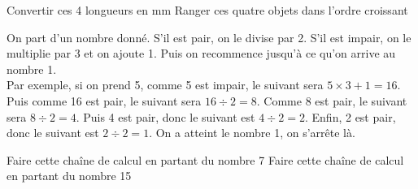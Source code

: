 \documentclass[../Cours.tex]{subfiles}
\begin{document}
\begin{questions}
    \question Convertir ces 4 longueurs en \unit{\milli\metre} 
    \question Ranger ces quatre objets dans l'ordre croissant 

    \clearpage

    On part d'un nombre donné. S'il est pair, on le divise par 2. S'il est impair, on le multiplie par 3 et on ajoute 1. Puis on recommence jusqu'à ce qu'on arrive au nombre 1.\\

    Par exemple, si on prend 5, comme 5 est impair, le suivant sera $5 \times 3 + 1 = 16$. Puis comme 16 est pair, le suivant sera $16 \div 2 = 8$. Comme 8 est pair, le suivant sera $8 \div 2 = 4$. Puis 4 est pair, donc le suivant est $4 \div 2 = 2$. Enfin, 2 est pair, donc le suivant est $2 \div 2 = 1$. On a atteint le nombre 1, on s'arrête là.

    \question Faire cette chaîne de calcul en partant du nombre 7 
    \question Faire cette chaîne de calcul en partant du nombre 15 
    
    
\end{questions}
\end{document}
